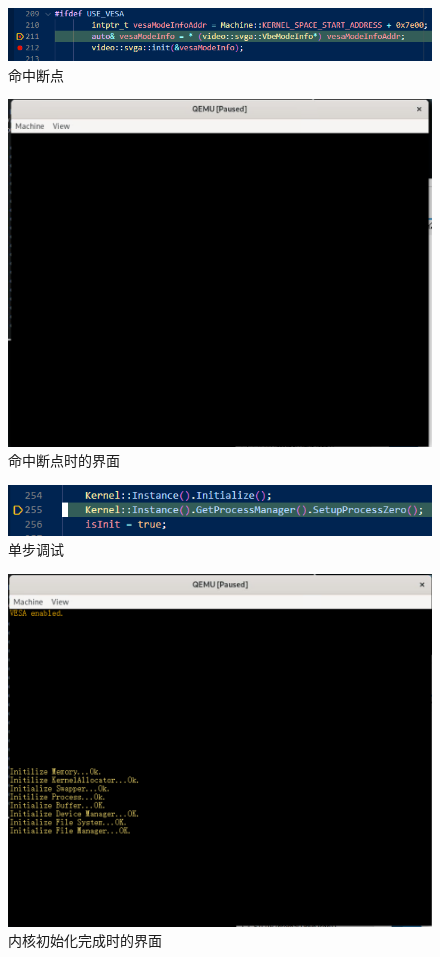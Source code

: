 \begin{figure}[!htbp]
    \centering
    \includegraphics[scale=0.7]{fig/hit.png}
    \caption{命中断点}\label{hit}
\end{figure}

\begin{figure}[!htbp]
    \centering
    \includegraphics[scale=0.5]{fig/hitScreen.png}
    \caption{命中断点时的界面}\label{hitScreen}
\end{figure}

\begin{figure}[!htbp]
    \centering
    \includegraphics[scale=1]{fig/stepOver.png}
    \caption{单步调试}\label{stepOver}
\end{figure}

\begin{figure}[!htbp]
    \centering
    \includegraphics[scale=0.5]{fig/initialized.png}
    \caption{内核初始化完成时的界面}\label{initialized}
\end{figure}


